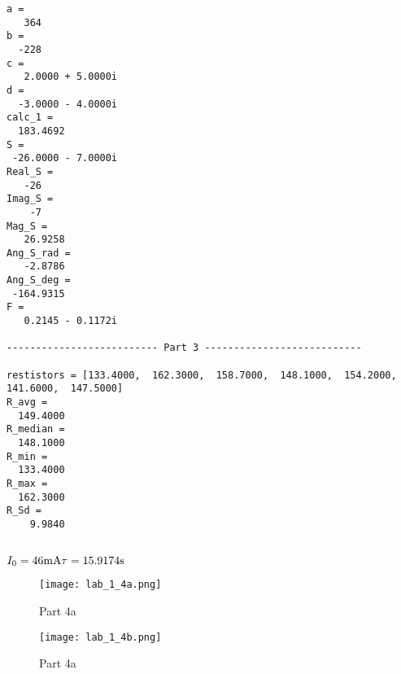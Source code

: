 \documentclass{article}
\begin{document}
\begin{verbatim}
a =
   364
b =
  -228
c =
   2.0000 + 5.0000i
d =
  -3.0000 - 4.0000i
calc_1 =
  183.4692
S =
 -26.0000 - 7.0000i
Real_S =
   -26
Imag_S =
    -7
Mag_S =
   26.9258
Ang_S_rad =
   -2.8786
Ang_S_deg =
 -164.9315
F =
   0.2145 - 0.1172i

-------------------------- Part 3 ---------------------------

restistors = [133.4000,  162.3000,  158.7000,  148.1000,  154.2000,  141.6000,  147.5000]
R_avg =
  149.4000
R_median =
  148.1000
R_min =
  133.4000
R_max =
  162.3000
R_Sd =
    9.9840


\end{verbatim}
$
I_0 = 46 \si{mA}\\
\tau = 15.9174 \si{s}
$

\medskip
 \begin{figure}[H]
  \texttt{[image: lab\_1\_4a.png]}
  \caption{Part 4a}
  \label{fig:4a}
\end{figure}

\begin{figure}[H]
  \texttt{[image: lab\_1\_4b.png]}
  \caption{Part 4a}
  \label{fig:4a}
\end{figure}

\pagebreak



\begin{lstlisting}

\end{lstlisting}
\end{document}
